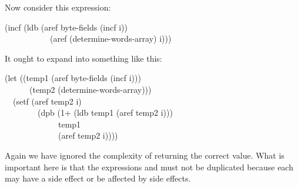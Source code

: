 Now consider this expression:
\begin{lisp}
(incf (ldb (aref byte-fields (incf i)) \\
~~~~~~~~~~~(aref (determine-words-array) i)))
\end{lisp}
It ought to expand into something like this:
\begin{lisp}
(let ((temp1 (aref byte-fields (incf i))) \\
~~~~~~(temp2 (determine-words-array))) \\
~~(setf (aref temp2 i) \\
~~~~~~~~(dpb (1+ (ldb temp1 (aref temp2 i))) \\
~~~~~~~~~~~~~temp1 \\
~~~~~~~~~~~~~(aref temp2 i))))
\end{lisp}
Again we have ignored the complexity of returning the correct value.
What is important here is that the expressions 
and 
must not be duplicated because each may have a side effect or
be affected by side effects.


